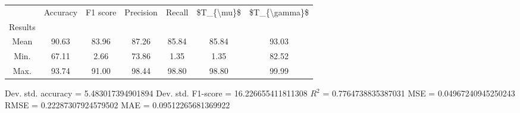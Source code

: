 \begin{tabular}{|c|c|c|c|c|c|c|}
\toprule
{} &  Accuracy &  F1 score &  Precision &  Recall &  \$T\_\{\textbackslash mu\}\$ &  \$T\_\{\textbackslash gamma\}\$ \\
Results &           &           &            &         &            &               \\
\hline
Mean    &     90.63 &     83.96 &      87.26 &   85.84 &      85.84 &         93.03 \\
Min.    &     67.11 &      2.66 &      73.86 &    1.35 &       1.35 &         82.52 \\
Max.    &     93.74 &     91.00 &      98.44 &   98.80 &      98.80 &         99.99 \\
\bottomrule
\end{tabular}

 Dev. std. accuracy = 5.483017394901894
 Dev. std. F1-score = 16.226655411811308
 $R^2$ = 0.7764738835387031
 MSE = 0.04967240945250243
 RMSE = 0.22287307924579502
 MAE = 0.09512265681369922